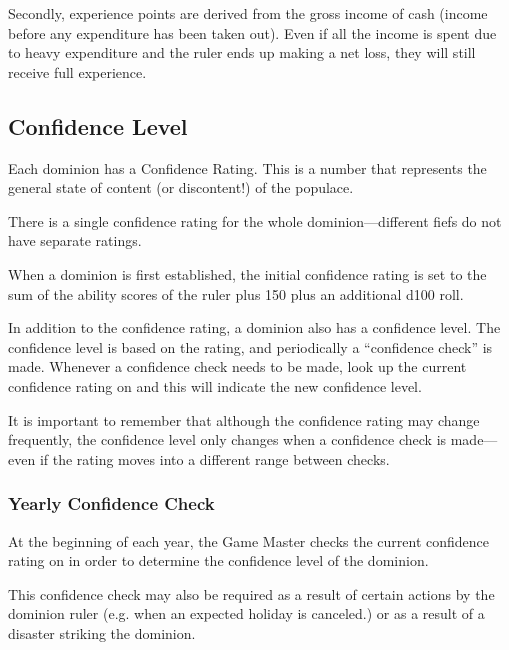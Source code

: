\begin{multicols*}{2}
Secondly, experience points are derived from the gross income of cash (income before any expenditure has been taken out). Even if all the income is spent due to heavy expenditure and the ruler ends up making a net loss, they will still receive full experience.


\subsection{Confidence Level}
Each dominion has a Confidence Rating. This is a number that represents the general state of content (or discontent!) of the populace.

There is a single confidence rating for the whole dominion—different fiefs do not have separate ratings.

When a dominion is first established, the initial confidence rating is set to the sum of the ability scores of the ruler plus 150 plus an additional d100 roll.

In addition to the confidence rating, a dominion also has a confidence level. The confidence level is based on the rating, and periodically a “confidence check” is made. Whenever a confidence check needs to be made, look up the current confidence rating on  and this will indicate the new confidence level.

It is important to remember that although the confidence rating may change frequently, the confidence level only changes when a confidence check is made—even if the rating moves into a different range between checks.

\subsubsection{Yearly Confidence Check}
At the beginning of each year, the Game Master checks the current confidence rating on  in order to determine the confidence level of the dominion.

This confidence check may also be required as a result of certain actions by the dominion ruler (e.g. when an expected holiday is canceled.) or as a result of a disaster striking the dominion.


\end{multicols*}
